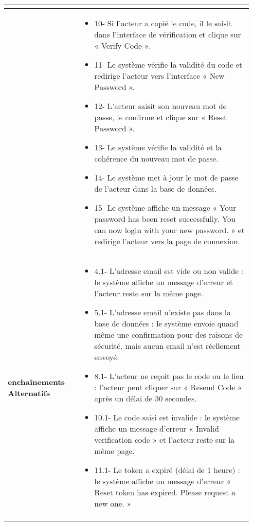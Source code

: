 \begin{longtable}{|>{\arraybackslash}p{4.2cm}|>{\arraybackslash}p{12.5cm}|}
\begin{itemize}[label=]
\end{itemize}\\
\hline
\textbf{} &

\begin{itemize}[label=]
    \item{10-} Si l'acteur a copié le code, il le saisit dans l'interface de vérification et clique sur « Verify Code ».
    \item{11-} Le système vérifie la validité du code et redirige l'acteur vers l'interface « New Password ».
    \item{12-} L'acteur saisit son nouveau mot de passe, le confirme et clique sur « Reset Password ».
    \item{13-} Le système vérifie la validité et la cohérence du nouveau mot de passe.
    \item{14-} Le système met à jour le mot de passe de l'acteur dans la base de données.
    \item{15-} Le système affiche un message « Your password has been reset successfully. You can now login with your new password. » et redirige l'acteur vers la page de connexion.
\end{itemize} \\
\hline

\textbf{enchaînements Alternatifs} &
\begin{itemize}[label=]
  \item{4.1-} L'adresse email est vide ou non valide : le système affiche un message d'erreur et l'acteur reste sur la même page.
    \item{5.1-} L'adresse email n'existe pas dans la base de données : le système envoie quand même une confirmation pour des raisons de sécurité, mais aucun email n'est réellement envoyé.
    \item{8.1-} L'acteur ne reçoit pas le code ou le lien : l'acteur peut cliquer sur « Resend Code » après un délai de 30 secondes.
    \item{10.1-} Le code saisi est invalide : le système affiche un message d'erreur « Invalid verification code » et l'acteur reste sur la même page.
    \item{11.1-} Le token a expiré (délai de 1 heure) : le système affiche un message d'erreur « Reset token has expired. Please request a new one. »
 \end{itemize}


\\
\hline
\textbf{} &


\end{longtable}
